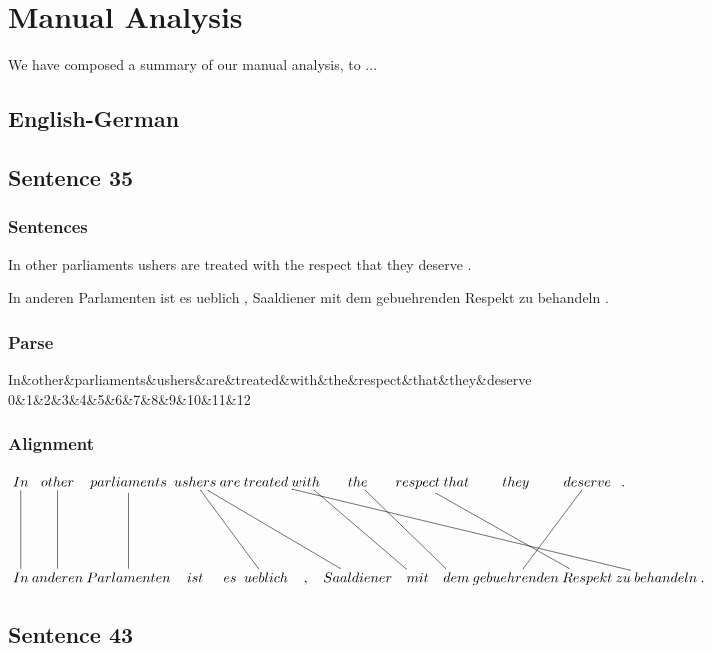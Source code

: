\documentclass{report}
\begin{document}
\appendix
\chapter{Manual Analysis}

We have composed a summary of our manual analysis, to ... 

\section{English-German}







\section*{Sentence 35}

\subsection*{Sentences}
In other parliaments ushers are treated with the respect that they deserve .

\noindent In anderen Parlamenten ist es ueblich , Saaldiener mit dem gebuehrenden Respekt zu behandeln .



\subsection*{Parse}
\begin{dependency}[theme=simple]
\begin{deptext}[column sep=.5cm, row sep=.1ex]
In\&other\&parliaments\&ushers\&are\&treated\&with\&the\&respect\&that\&they\&deserve\\
0\&1\&2\&3\&4\&5\&6\&7\&8\&9\&10\&11\&12\\
\end{deptext}
\end{dependency}


\subsection*{Alignment}
\scriptsize{
$
\xymatrix@C-2.3pc{
In \ar @{-} [dd] & other \ar @{-} [dd] & parliaments \ar @{-} [dd] & ushers \ar @{-} [ddrrrr] \ar @{-} [ddrr] & are & treated \ar @{-} [ddrrrrrrrr] & with \ar @{-} [ddrr] & the \ar @{-} [ddrr] & respect \ar @{-} [ddrrr] & that & they & deserve \ar @{-} [ddl] & .\\\\
In & anderen & Parlamenten & ist & es & ueblich & , & Saaldiener & mit & dem & gebuehrenden & Respekt & zu & behandeln & .
}$}
\newpage\section*{Sentence 43}
\end{document}
